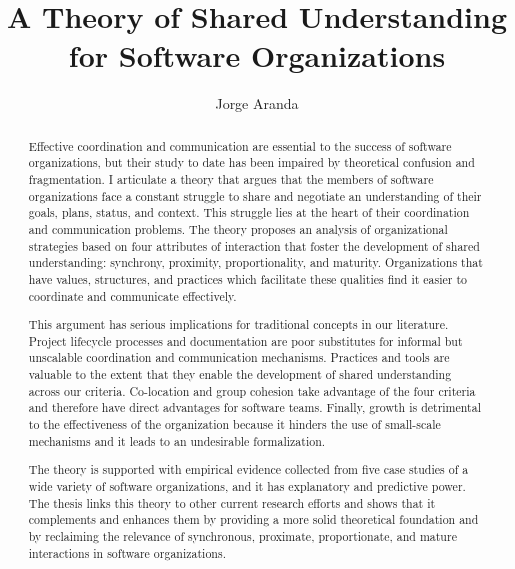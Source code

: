 \documentclass{ut-thesis}
\author{Jorge Aranda}
\title{A Theory of Shared Understanding \\ for Software Organizations}
\begin{document}
\begin{preliminary}
\maketitle

\begin{abstract}
Effective coordination and communication are essential to the success of software organizations, but their study to date has been impaired by theoretical confusion and fragmentation. I articulate a theory that argues that the members of software organizations face a constant struggle to share and negotiate an understanding of their goals, plans, status, and context. This struggle lies at the heart of their coordination and communication problems. The theory proposes an analysis of organizational strategies based on four attributes of interaction that foster the development of shared understanding: synchrony, proximity, proportionality, and maturity. Organizations that have values, structures, and practices which facilitate these qualities find it easier to coordinate and communicate effectively.

This argument has serious implications for traditional concepts in our literature. Project lifecycle processes and documentation are poor substitutes for informal but unscalable coordination and communication mechanisms. Practices and tools are valuable to the extent that they enable the development of shared understanding across our criteria. Co-location and group cohesion take advantage of the four criteria and therefore have direct advantages for software teams. Finally, growth is detrimental to the effectiveness of the organization because it hinders the use of small-scale mechanisms and it leads to an undesirable formalization.

The theory is supported with empirical evidence collected from five case studies of a wide variety of software organizations, and it has explanatory and predictive power. The thesis links this theory to other current research efforts and shows that it complements and enhances them by providing a more solid theoretical foundation and by reclaiming the relevance of synchronous, proximate, proportionate, and mature interactions in software organizations.
\end{abstract}



\end{preliminary}
\end{document}
